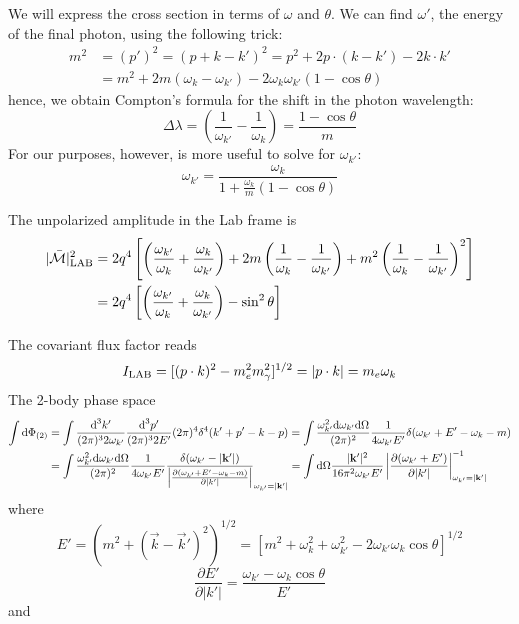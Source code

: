 \documentclass[TheoreticalPhy_ModB.tex]{subfiles}
\begin{document}
\begin{figure}[H]
\centering

\end{figure}

We will express the cross section in terms of $\omega$ and $\theta$. We can find $\omega'$, the energy of the final photon, using the following trick:
\begin{align*}
m^2&=(p')^2=(p+k-k')^2=p^2+2p\cdot(k-k')-2k\cdot k'\\
&=m^2+2m(\omega_k-\omega_{k'})-2\omega_k\omega_{k'}(1-\cos\theta)
\end{align*}
hence, we obtain Compton's formula for the shift in the photon wavelength:
\[\Delta\lambda=\left(\frac1{\omega_{k'}}-\frac1{\omega_{k}}\right)=\frac{1-\cos\theta}{m}\]
For our purposes, however, is more useful to solve for $\omega_{k'}$:
\begin{equation}\label{eqn:QED-compton-energies-lab}
\omega_{k'}=\frac{\omega_k}{1+\frac{\omega_{k}}m(1-\cos\theta)}
\end{equation}

The unpolarized amplitude in the Lab frame is
\begin{align*}
|\bar{\mathcal M}|_{\textup{LAB}}^2&=2q^4\left[\left(\frac{\omega_{k'}}{\omega_k}+\frac{\omega_k}{\omega_{k'}}\right)+2m\left(\frac1{\omega_k}-\frac1{\omega_{k'}}\right)+m^2\left(\frac1{\omega_k}-\frac1{\omega_{k'}}\right)^2\right]\\
&=2q^4\left[\left(\frac{\omega_{k'}}{\omega_k}+\frac{\omega_k}{\omega_{k'}}\right)-\sin^2\theta\right]
\end{align*}

The covariant flux factor reads
\[I_{\textup{LAB}}=[(p\cdot k)^2-m_e^2m_\gamma^2]^{1/2}=|p\cdot k|=m_e\omega_k\]
The 2-body phase space
\begin{align*}
\int\textup{d}\Phi_{(2)}&=\int \frac{\textup{d}^3k'}{(2\pi)^32\omega_{k'}}\frac{\textup{d}^3p'}{(2\pi)^32E'}(2\pi)^4\delta^4(k'+p'-k-p)
=\int\frac{\omega^2_{k'}\textup{d}\omega_{k'}\textup{d}\Omega}{(2\pi)^2}\frac{1}{4\omega_{k'}E'}\delta(\omega_{k'}+E'-\omega_k-m)\\
&=\int\frac{\omega^2_{k'}\textup{d}\omega_{k'}\textup{d}\Omega}{(2\pi)^2}\frac{1}{4\omega_{k'}E'}\frac{\delta(\omega_{k'}-|\mathbf k'|)}{\left|\frac{\partial(\omega_{k'}+E'-\omega_k-m)}{\partial|k'|}\right|}_{\omega_{k'}=|\mathbf k'|}
=\int\textup{d}\Omega\frac{|\mathbf k'|^2}{16\pi^2\omega_{k'}E'}\left|\frac{\partial(\omega_{k'}+E')}{\partial|k'|}\right|^{-1}_{\omega_{k'}=|\mathbf k'|}
\end{align*}
where 
\[E'=\left(m^2+(\vec k-\vec k')^2\right)^{1/2}
=\left[m^2+\omega_k^2+\omega_{k'}^2-2\omega_{k'}\omega_k\cos\theta\right]^{1/2}\]
\[\frac{\partial E'}{\partial|k'|}=\frac{\omega_{k'}-\omega_k\cos\theta}{E'}\]
and
\end{document}
